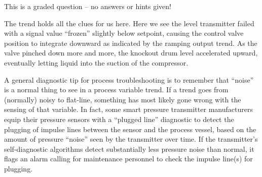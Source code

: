 \eject






This is a graded question -- no answers or hints given!







The trend holds all the clues for us here.  Here we see the level transmitter failed with a signal value ``frozen'' slightly below setpoint, causing the control valve position to integrate downward as indicated by the ramping output trend.  As the valve pinched down more and more, the knockout drum level accelerated upward, eventually letting liquid into the suction of the compressor.

\vskip 10pt

A general diagnostic tip for process troubleshooting is to remember that ``noise'' is a normal thing to see in a process variable trend.  If a trend goes from (normally) noisy to flat-line, something has most likely gone wrong with the sensing of that variable.  In fact, some smart pressure transmitter manufacturers equip their pressure sensors with a ``plugged line'' diagnostic to detect the plugging of impulse lines between the sensor and the process vessel, based on the amount of pressure ``noise'' seen by the transmitter over time.  If the transmitter's self-diagnostic algorithms detect substantially less pressure noise than normal, it flags an alarm calling for maintenance personnel to check the impulse line(s) for plugging.




